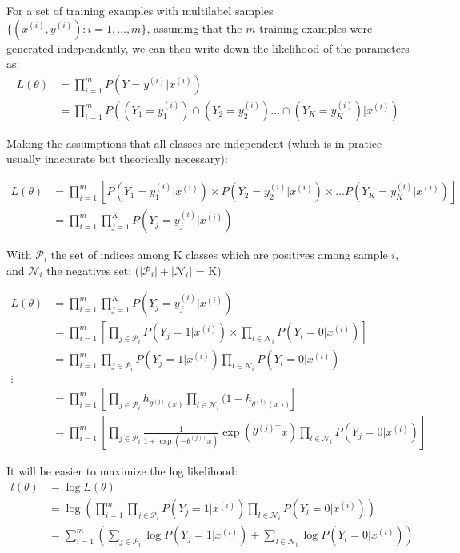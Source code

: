 For a set of training examples with multilabel samples $\{ (x^{(i)}, y^{(i)}) : i=1,\ldots,m\}$, assuming that the $m$ training examples were generated independently, we can then write down the likelihood of the parameters as:
\begin{align}
	L(\theta) &= \prod_{i=1}^m P(Y=y^{(i)} | x^{(i)} ) \\
			  &= \prod_{i=1}^m P((Y_1=y_1^{(i)}) \cap (Y_2=y_2^{(i)}) \dots \cap (Y_K=y_K^{(i)})| x^{(i)})
\end{align}

Making the assumptions that all classes are independent (which is in pratice usually inaccurate but theorically necessary):

\begin{align}
	L(\theta) &= \prod_{i=1}^m \left[ P(Y_1=y_1^{(i)} | x^{(i)}) \times P(Y_2=y_2^{(i)} | x^{(i)}) \times \dots P(Y_K=y_K^{(i)} | x^{(i)}) \right] \\
			  &= \prod_{i=1}^m \prod_{j=1}^K P(Y_j=y_j^{(i)} | x^{(i)}) 
\end{align}

With $\mathcal{P}_i$ the set of indices among K classes which are positives among sample $i$, and $\mathcal{N}_i$ the negatives set: ($|\mathcal{P}_i| + |\mathcal{N}_i|$ = K)

\begin{align}
	L(\theta) &= \prod_{i=1}^m \prod_{j=1}^K P(Y_j=y_j^{(i)} | x^{(i)}) \\
			  &= \prod_{i=1}^m \left[ \prod_{j \in \mathcal{P}_i } P(Y_j=1 | x^{(i)}) \times \prod_{l \in \mathcal{N}_i} P(Y_l=0 | x^{(i)}) \right] \\
			  &= \prod_{i=1}^m  \prod_{j \in \mathcal{P}_i } P(Y_j=1 | x^{(i)}) \prod_{l \in \mathcal{N}_i} P(Y_l=0 | x^{(i)})  \\
			  \vdots\\
			  &= \prod_{i=1}^m \left[ \prod_{j \in \mathcal{P}_i } h_{\theta^{(j)}(x)} \prod_{l \in \mathcal{N}_i} (1 - h_{\theta^{(l)}(x))} \right] \\
			  &= \prod_{i=1}^m \left[ \prod_{j \in \mathcal{P}_i } \frac{1}{1 + \exp(-\theta^{(j)\top} x)} \exp(\theta^{(j)\top} x ) \prod_{l \in \mathcal{N}_i} P(Y_j=0 | x^{(i)}) \right]
\end{align}



It will be easier to maximize the log likelihood:
\begin{align}
	l(\theta) &= \log L(\theta) \\
			  &= \log \left( \prod_{i=1}^m  \prod_{j \in \mathcal{P}_i } P(Y_j=1 | x^{(i)}) \prod_{l \in \mathcal{N}_i} P(Y_l=0 | x^{(i)}) \right) \\
			  &= \sum_{i=1}^m \left( \sum_{j \in \mathcal{P}_i } \log P(Y_j=1 | x^{(i)}) + \sum_{l \in \mathcal{N}_i} \log P(Y_l=0 | x^{(i)})  \right)
\end{align}

